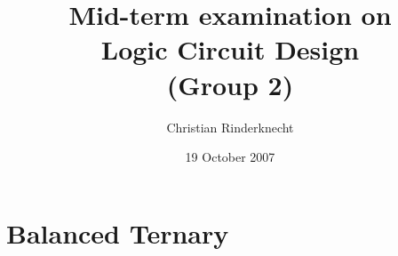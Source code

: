 \documentclass[11pt,a4paper]{article}
\title{Mid-term examination on\\ Logic Circuit Design\\ (Group 2)}
\author{Christian Rinderknecht}
\date{19 October 2007}
\begin{document}
\maketitle
\thispagestyle{empty}

\allowdisplaybreaks

\section{Balanced Ternary}



\end{document}
